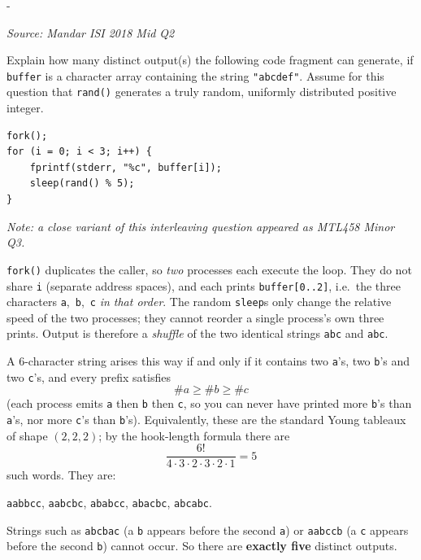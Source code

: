\documentclass[11pt,a4paper]{article}
\makeatletter
\newcommand{\keepspace}[1]{\par\penalty-100\begingroup
  \setlength{\dimen@}{#1}\dimen@ii\pagegoal\advance\dimen@ii-\pagetotal
  \ifdim\dimen@>\dimen@ii\ifdim\dimen@ii>\z@\vfil\fi\break\fi\endgroup}
\newcounter{qn}[section]
\newenvironment{Qn}[4]{%
  \refstepcounter{qn}\keepspace{7\baselineskip}%
  \begin{tcolorbox}[qboxstyle, title={Q\thesection.\theqn\ \ [#1 \textbar\ #2]\ \ #4}]%
  {\footnotesize\color{g3}\textit{Source: #3}}\par\smallskip%
}{%
  \end{tcolorbox}%
}
\newenvironment{Sol}{%
  \begin{tcolorbox}[sboxstyle, title={Solution}]%
}{%
  \end{tcolorbox}\vspace{0.35em}%
}
\makeatother
\begin{document}
\begin{Qn}{Hard}{Lect 3}{Mandar ISI 2018 Mid Q2}{\texttt{fork} then three \texttt{fprintf}s: how many distinct outputs?}
Explain how many distinct output(s) the following code fragment can generate, if \texttt{buffer} is a character array containing the string \texttt{"abcdef"}. Assume for this question that \texttt{rand()} generates a truly random, uniformly distributed positive integer.
\begin{lstlisting}[numbers=none]
fork();
for (i = 0; i < 3; i++) {
    fprintf(stderr, "%c", buffer[i]);
    sleep(rand() % 5);
}
\end{lstlisting}
\textit{Note: a close variant of this interleaving question appeared as MTL458 Minor Q3.}
\end{Qn}
\begin{Sol}
\texttt{fork()} duplicates the caller, so \emph{two} processes each execute the loop. They do not share \texttt{i} (separate address spaces), and each prints \texttt{buffer[0..2]}, i.e.\ the three characters \texttt{a},~\texttt{b},~\texttt{c} \emph{in that order}. The random \texttt{sleep}s only change the relative speed of the two processes; they cannot reorder a single process's own three prints. Output is therefore a \emph{shuffle} of the two identical strings \texttt{abc} and \texttt{abc}.

A 6-character string arises this way if and only if it contains two \texttt{a}'s, two \texttt{b}'s and two \texttt{c}'s, and every prefix satisfies
\[
\#a \ge \#b \ge \#c
\]
(each process emits \texttt{a} then \texttt{b} then \texttt{c}, so you can never have printed more \texttt{b}'s than \texttt{a}'s, nor more \texttt{c}'s than \texttt{b}'s). Equivalently, these are the standard Young tableaux of shape $(2,2,2)$; by the hook-length formula there are
\[
\frac{6!}{4\cdot 3\cdot 2\cdot 3\cdot 2\cdot 1} = 5
\]
such words. They are:
\begin{center}
\texttt{aabbcc},\quad
\texttt{aabcbc},\quad
\texttt{ababcc},\quad
\texttt{abacbc},\quad
\texttt{abcabc}.
\end{center}
Strings such as \texttt{abcbac} (a \texttt{b} appears before the second \texttt{a}) or \texttt{aabccb} (a \texttt{c} appears before the second \texttt{b}) cannot occur. So there are \textbf{exactly five} distinct outputs.
\end{Sol}
\end{document}
